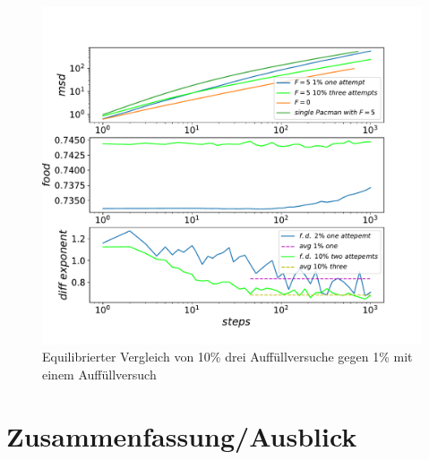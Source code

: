\documentclass[a4paper, 12pt]{report}
\begin{document}
\begin{figure}[H]
	\centering
	\includegraphics[scale=0.72]{10_3_vs_1_1.pdf}
	\caption{Equilibrierter Vergleich von 10\% drei Auffüllversuche gegen 1\% mit einem Auffüllversuch}
\end{figure}

\clearpage
\chapter{Zusammenfassung/Ausblick}
\end{document}
